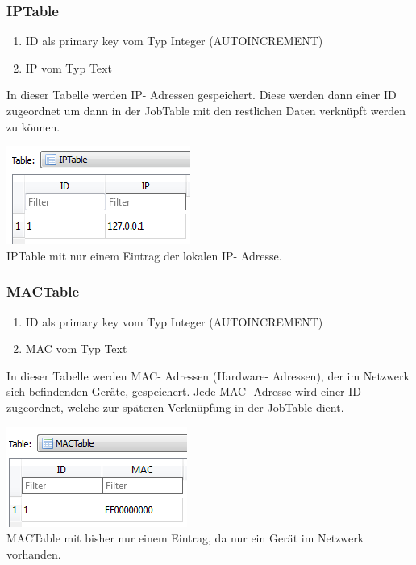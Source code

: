 \documentclass[12pt,a4paper]{report}
\begin{document}
\begin{onehalfspace}
\subsubsection{IPTable}
\begin{enumerate}
\item ID als primary key vom Typ Integer (AUTOINCREMENT)
\item IP vom Typ Text
\end{enumerate}
In dieser Tabelle werden IP- Adressen gespeichert. Diese werden dann einer ID zugeordnet um dann in der JobTable mit den restlichen Daten verknüpft werden zu können.
\begin{center}
\includegraphics[scale=0.8]{img/db-tb-ip.png}\\
IPTable mit nur einem Eintrag der lokalen IP- Adresse.
\end{center}
\subsubsection{MACTable}
\begin{enumerate}
\item ID als primary key vom Typ Integer (AUTOINCREMENT)
\item MAC vom Typ Text
\end{enumerate}
In dieser Tabelle werden MAC- Adressen (Hardware- Adressen), der im Netzwerk sich befindenden Geräte, gespeichert. Jede MAC- Adresse wird einer ID zugeordnet, welche zur späteren Verknüpfung in der JobTable dient.
\begin{center}
\includegraphics[scale=0.8]{img/db-tb-mac.png}\\
MACTable mit bisher nur einem Eintrag, da nur ein Gerät im Netzwerk vorhanden.
\end{center}

\end{onehalfspace}
\end{document}
